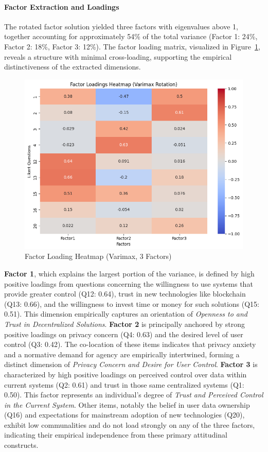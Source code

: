 	\paragraph{Factor Extraction and Loadings}
	The rotated factor solution yielded three factors with eigenvalues above 1, together accounting for approximately 54\% of the total variance (Factor 1: 24\%, Factor 2: 18\%, Factor 3: 12\%). The factor loading matrix, visualized in Figure~\ref{fig:factor_loadings_heatmap}, reveals a structure with minimal cross-loading, supporting the empirical distinctiveness of the extracted dimensions.
	\begin{figure}[ht]\centering
		\includegraphics[width=1\linewidth]{figures/img/factor_analysis/factor_loadings_heatmap.png}
		\caption{Factor Loading Heatmap (Varimax, 3 Factors)}
		\label{fig:factor_loadings_heatmap}
	\end{figure}
	\textbf{Factor 1}, which explains the largest portion of the variance, is defined by high positive loadings from questions concerning the willingness to use systems that provide greater control (Q12: 0.64), trust in new technologies like blockchain (Q13: 0.66), and the willingness to invest time or money for such solutions (Q15: 0.51). This dimension empirically captures an orientation of \textit{Openness to and Trust in Decentralized Solutions}.
	\textbf{Factor 2} is principally anchored by strong positive loadings on privacy concern (Q4: 0.63) and the desired level of user control (Q3: 0.42). The co-location of these items indicates that privacy anxiety and a normative demand for agency are empirically intertwined, forming a distinct dimension of \textit{Privacy Concern and Desire for User Control}.
	\textbf{Factor 3} is characterized by high positive loadings on perceived control over data within current systems (Q2: 0.61) and trust in those same centralized systems (Q1: 0.50). This factor represents an individual's degree of \textit{Trust and Perceived Control in the Current System}.
	Other items, notably the belief in user data ownership (Q16) and expectations for mainstream adoption of new technologies (Q20), exhibit low communalities and do not load strongly on any of the three factors, indicating their empirical independence from these primary attitudinal constructs.

